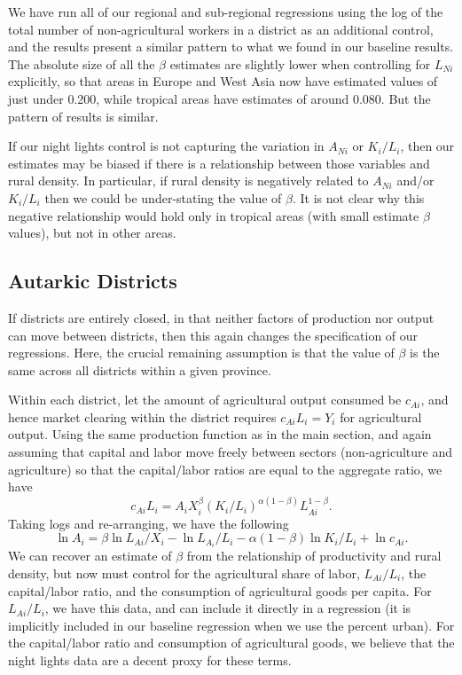 \documentclass[11pt]{article}
\begin{document}
We have run all of our regional and sub-regional regressions using the log of the total number of non-agricultural workers in a district as an additional control, and the results present a similar pattern to what we found in our baseline results. The absolute size of all the $\beta$ estimates are slightly lower when controlling for $L_{Ni}$ explicitly, so that areas in Europe and West Asia now have estimated values of just under 0.200, while tropical areas have estimates of around 0.080. But the pattern of results is similar.

If our night lights control is not capturing the variation in $A_{Ni}$ or $K_i/L_i$, then our estimates may be biased if there is a relationship between those variables and rural density. In particular, if rural density is negatively related to $A_{Ni}$ and/or $K_i/L_i$ then we could be under-stating the value of $\beta$. It is not clear why this negative relationship would hold only in tropical areas (with small estimate $\beta$ values), but not in other areas.

\subsection{Autarkic Districts}
If districts are entirely closed, in that neither factors of production nor output can move between districts, then this again changes the specification of our regressions. Here, the crucial remaining assumption is that the value of $\beta$ is the same across all districts within a given province. 

Within each district, let the amount of agricultural output consumed be $c_{Ai}$, and hence market clearing within the district requires $c_{Ai} L_i = Y_i$ for agricultural output. Using the same production function as in the main section, and again assuming that capital and labor move freely between sectors (non-agriculture and agriculture) so that the capital/labor ratios are equal to the aggregate ratio, we have
\begin{equation}
	c_{Ai} L_i = A_i X_i^{\beta} \left(K_i/L_i\right)^{\alpha(1-\beta)} L_{Ai}^{1-\beta}.
\end{equation}
Taking logs and re-arranging, we have the following
\begin{equation}
	\ln A_i = \beta \ln L_{Ai}/X_i - \ln L_{A_i}/L_i - \alpha(1-\beta) \ln K_{i}/L_{i} + \ln c_{Ai}.
\end{equation}
We can recover an estimate of $\beta$ from the relationship of productivity and rural density, but now must control for the agricultural share of labor, $L_{Ai}/L_i$, the capital/labor ratio, and the consumption of agricultural goods per capita. For $L_{Ai}/L_i$, we have this data, and can include it directly in a regression (it is implicitly included in our baseline regression when we use the percent urban). For the capital/labor ratio and consumption of agricultural goods, we believe that the night lights data are a decent proxy for these terms.
\end{document}
